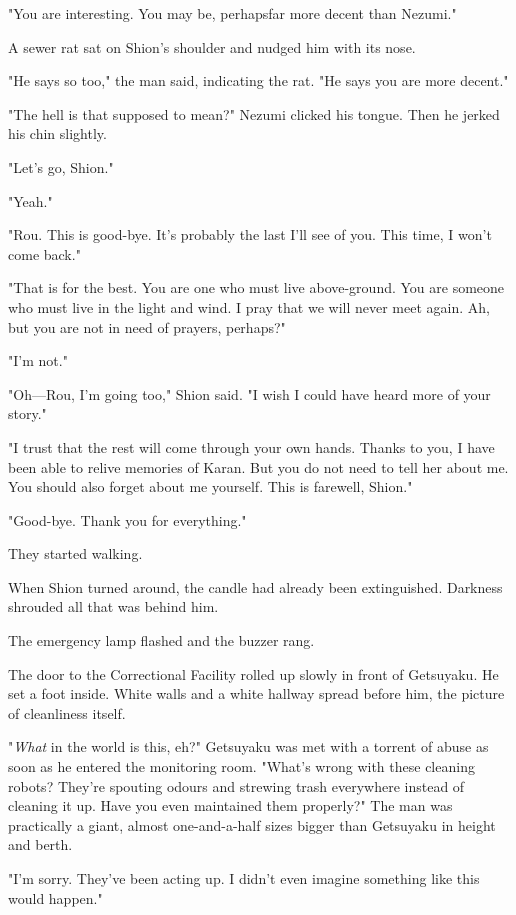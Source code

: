 "You are interesting. You may be, perhaps\el far more decent than
Nezumi."

A sewer rat sat on Shion's shoulder and nudged him with its nose.

"He says so too," the man said, indicating the rat. "He says you are
more decent."

"The hell is that supposed to mean?" Nezumi clicked his tongue. Then he
jerked his chin slightly.

"Let's go, Shion."

"Yeah."

"Rou. This is good-bye. It's probably the last I'll see of you. This
time, I won't come back."

"That is for the best. You are one who must live above-ground. You are
someone who must live in the light and wind. I pray that we will never
meet again. Ah, but you are not in need of prayers, perhaps?"

"I'm not."

"Oh---Rou, I'm going too," Shion said. "I wish I could have heard more of
your story."

"I trust that the rest will come through your own hands. Thanks to you,
I have been able to relive memories of Karan. But you do not need to
tell her about me. You should also forget about me yourself. This is
farewell, Shion."

"Good-bye. Thank you for everything."

They started walking.

When Shion turned around, the candle had already been extinguished.
Darkness shrouded all that was behind him.

\mybreak

The emergency lamp flashed and the buzzer rang.

The door to the Correctional Facility rolled up slowly in front of
Getsuyaku. He set a foot inside. White walls and a white hallway spread
before him, the picture of cleanliness itself.

"\emph{What} in the world is this, eh?" Getsuyaku was met with a torrent of
abuse as soon as he entered the monitoring room. "What's wrong with
these cleaning robots? They're spouting odours and strewing trash
everywhere instead of cleaning it up. Have you even maintained them
properly?" The man was practically a giant, almost one-and-a-half sizes
bigger than Getsuyaku in height and berth.

"I'm sorry. They've been acting up. I didn't even imagine something like
this would happen."

